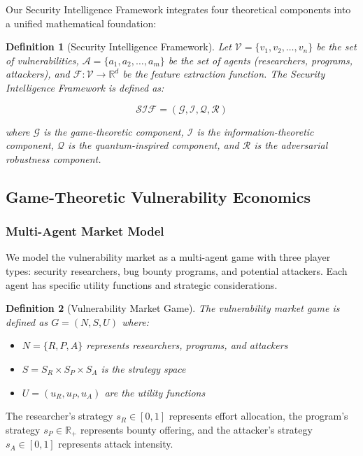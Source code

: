 \documentclass[journal]{IEEEtran}
\newtheorem{definition}{Definition}
\begin{document}
Our Security Intelligence Framework integrates four theoretical components into a unified mathematical foundation:

\begin{definition}[Security Intelligence Framework]
Let $\mathcal{V} = \{v_1, v_2, \ldots, v_n\}$ be the set of vulnerabilities, $\mathcal{A} = \{a_1, a_2, \ldots, a_m\}$ be the set of agents (researchers, programs, attackers), and $\mathcal{F}: \mathcal{V} \rightarrow \mathbb{R}^d$ be the feature extraction function. The Security Intelligence Framework is defined as:

$$\mathcal{SIF} = (\mathcal{G}, \mathcal{I}, \mathcal{Q}, \mathcal{R})$$

where $\mathcal{G}$ is the game-theoretic component, $\mathcal{I}$ is the information-theoretic component, $\mathcal{Q}$ is the quantum-inspired component, and $\mathcal{R}$ is the adversarial robustness component.
\end{definition}

\subsection{Game-Theoretic Vulnerability Economics}

\subsubsection{Multi-Agent Market Model}

We model the vulnerability market as a multi-agent game with three player types: security researchers, bug bounty programs, and potential attackers. Each agent has specific utility functions and strategic considerations.

\begin{definition}[Vulnerability Market Game]
The vulnerability market game is defined as $G = (N, S, U)$ where:
\begin{itemize}
\item $N = \{R, P, A\}$ represents researchers, programs, and attackers
\item $S = S_R \times S_P \times S_A$ is the strategy space
\item $U = (u_R, u_P, u_A)$ are the utility functions
\end{itemize}
\end{definition}

The researcher's strategy $s_R \in [0,1]$ represents effort allocation, the program's strategy $s_P \in \mathbb{R}_+$ represents bounty offering, and the attacker's strategy $s_A \in [0,1]$ represents attack intensity.
\end{document}
